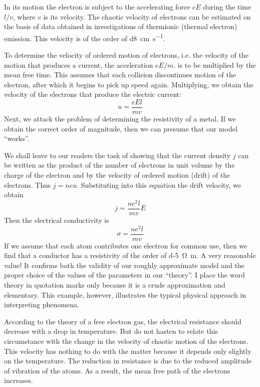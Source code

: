 In its motion the electron is subject to the accelerating force $eE$ during the time $l/v$, where $v$ is its velocity. The chaotic velocity of electrons can be estimated on the basis of data obtained in investigations of thermionic (thermal electron) emission. This velocity is of the order of \SI{d8}{\centi\meter\per\second}.

To determine the velocity of ordered motion of electrons, i.e. the velocity of the motion that produces a current, the acceleration $eE/m$. is to be multiplied by the mean free time. This assumes that each collision discontinues motion of the electron, after which it begins to pick up speed again. Multiplying, we obtain the velocity of the electrons that produce the electric current:
\begin{equation*}%
u= \frac{eEl}{mv}
\end{equation*}
Next, we attack the problem of determining the resistivity of a metal. If we obtain the correct order of magnitude, then we can presume that our model ``works''.

We shall leave to our readers the task of showing that the current density $j$ can be written as the product of the number of electrons in unit volume by the charge of the electron and by the velocity of ordered motion (drift) of the electrons. Thus $j=neu$. Substituting into this equation the drift velocity, we obtain 
\begin{equation*}%
j = \frac{ne^{2}l}{mv}E
\end{equation*}
Then the electrical conductivity is
\begin{equation*}%
\sigma = \frac{ne^{2}l}{mv}
\end{equation*}
If we assume that each atom contributes one electron for common use, then we find that a conductor has a resistivity of the order of \SI{d-5}{\ohm\meter}. A very reasonable value! It confirms both the validity of our roughly approximate model and the proper choice of the values of the parameters in our ``theory''. I place the word theory in quotation marks only because it is a crude approximation and elementary. This example, however, illustrates the typical physical approach in interpreting phenomena.


According to the theory of a free electron gas, the electrical resistance should decrease with a drop in temperature. But do not hasten to relate this circumstance with the change in the velocity of chaotic motion of the electrons. This velocity has nothing to do with the matter because it depends only slightly on the temperature. The reduction in resistance is due to the reduced amplitude of vibration of the atoms. As a result, the mean free path of the electrons increases.

